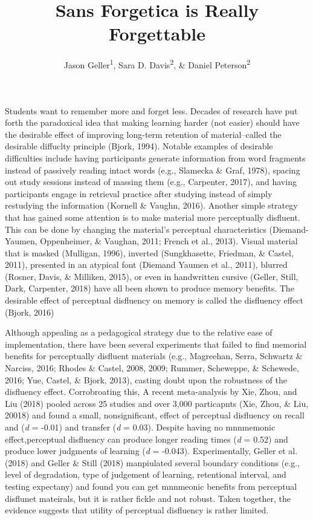 \documentclass[pdf]{apa6}
\affiliation{
\vspace{0.5cm}
\textsuperscript{1} University of Iowa\\\textsuperscript{2} Skidmore College}
\title{Sans Forgetica is Really Forgettable}
\author{Jason Geller\textsuperscript{1}, Sara D. Davis\textsuperscript{2}, \& Daniel Peterson\textsuperscript{2}}
\date{}
\begin{document}
\maketitle

Students want to remember more and forget less. Decades of research have put forth the paradoxical idea that making learning harder (not easier) should have the desirable effect of improving long-term retention of material--called the desirable diffuclty principle (Bjork, 1994). Notable examples of desirable difficulties include having participants generate information from word fragments instead of passively reading intact words (e.g., Slamecka \& Graf, 1978), spacing out study sessions instead of massing them (e.g., Carpenter, 2017), and having participants engage in retrieval practice after studying instead of simply restudying the information (Kornell \& Vaughn, 2016). Another simple strategy that has gained some attention is to make material more perceptually disfluent. This can be done by changing the material's perceptual characteristics (Diemand-Yaumen, Oppenheimer, \& Vaughan, 2011; French et al., 2013). Visual material that is masked (Mulligan, 1996), inverted (Sungkhasette, Friedman, \& Castel, 2011), presented in an atypical font (Diemand Yaumen et al., 2011), blurred (Rosner, Davis, \& Milliken, 2015), or even in handwritten cursive (Geller, Still, Dark, Carpenter, 2018) have all been shown to produce memory benefits. The desirable effect of perceptual disfluency on memory is called the disfluency effect (Bjork, 2016)

Although appealing as a pedagogical strategy due to the relative ease of implementation, there have been several experiments that failed to find memorial benefits for perceptually disfluent materials (e.g., Magreehan, Serra, Schwartz \& Narciss, 2016; Rhodes \& Castel, 2008, 2009; Rummer, Scheweppe, \& Schewede, 2016; Yue, Castel, \& Bjork, 2013), casting doubt upon the robustness of the disfluency effect. Corrobroating this, A recent meta-analysis by Xie, Zhou, and Liu (2018) pooled across 25 studies and over 3,000 particapnts (Xie, Zhou, \& Liu, 20018) and found a small, nonsignificant, effect of perceptual disfluency on recall and (\emph{d} = -0.01) and transfer (\emph{d} = 0.03). Despite having no mnnmemonic effect,perceptual disfluency can produce longer reading times (\emph{d} = 0.52) and produce lower judgments of learning (\emph{d} = -0.043). Experimentally, Geller et al.(2018) and Geller \& Still (2018) manpiulated several boundary conditions (e.g., level of degradation, type of judgement of learning, retentional interval, and testing expectany) and found you can get mnnmeonic benefits from perceptual disflunet mateirals, but it is rather fickle and not robust. Taken together, the evidence suggests that utility of perceptual disfluency is rather limited.
\end{document}

